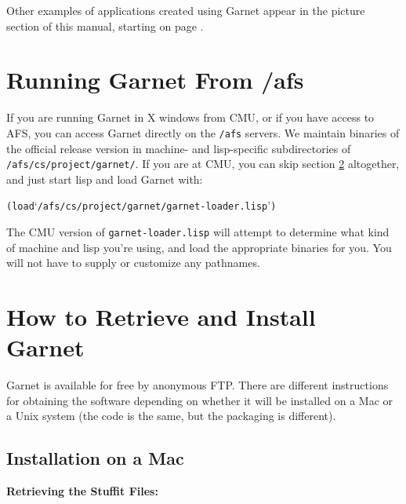 \documentclass{report}
\begin{document}
Other examples of applications created using Garnet appear in the
picture section of this manual, starting on page \pageref{apps}.


\section{Running Garnet From /afs}

If you are running Garnet in X windows from CMU, or if you have access
to AFS, you can access Garnet directly on the \texttt{/afs} servers.  We
maintain binaries of the official release version in machine- and
lisp-specific subdirectories of \texttt{/afs/cs/project/garnet/}.  If you
are at CMU, you can skip section \ref{retrieving} altogether, and just
start lisp and load Garnet with:

\begin{alltt}
  (load `/afs/cs/project/garnet/garnet-loader.lisp')
  \end{alltt}

The CMU version of \texttt{garnet-loader.lisp} will attempt to determine
what kind of machine and lisp you're using, and load the appropriate
binaries for you.  You will not have to supply or customize any
pathnames.

\section{How to Retrieve and Install Garnet}
\label{retrieving}
     

Garnet is available for free by anonymous FTP.  There are different
instructions for obtaining the software depending on whether it will
be installed on a Mac or a Unix system (the code is the same, but the
packaging is different).

\subsection{Installation on a Mac}

{\bf Retrieving the Stuffit Files:}
\end{document}
